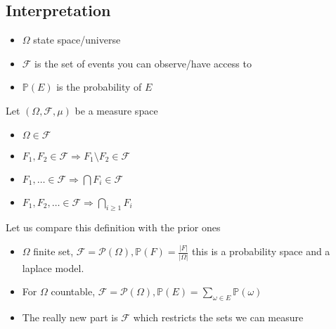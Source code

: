 \documentclass[../main.tex]{subfiles}
\begin{document}
\subsection*{Interpretation}
\begin{itemize}
\item $\Omega$ state space/universe
\item $\mathcal{F}$ is the set of events you can observe/have access to
\item $ \mathbb{P}( E) $ is the probability of $E$ 
\end{itemize}
\begin{lemma}
	Let $ ( \Omega, \mathcal{F}, \mu) $ be a measure space
	\begin{itemize}
	\item $\Omega \in \mathcal{F}$ 
	\item $F_1,F_2 \in \mathcal{F} \Rightarrow F_1\setminus F_2 \in \mathcal{F}$ 
	\item $F_1, \ldots \in \mathcal{F} \Rightarrow \bigcap F_i \in \mathcal{F}$ 
	\item  $F_1, F_2, \ldots \in \mathcal{F} \Rightarrow \bigcap_{i \geq 1} F_i$ 
	\end{itemize}
	
\end{lemma}
Let us compare this definition with the prior ones
\begin{itemize}
	\item $\Omega$ finite set, $ \mathcal{F}= \mathcal{P}( \Omega) , \mathbb{P}( F) = \frac{|F|}{|\Omega|}$ this is a probability space and a laplace model.
	\item For $\Omega$ countable, $ \mathcal{F} = \mathcal{P}( \Omega) , \mathbb{P}( E) = \sum_{\omega \in E}^{ }\mathbb{P}( \omega) $ 
	\item The really new part is $ \mathcal{F}$ which restricts the sets we can measure
\end{itemize}
	
		
\end{document}
